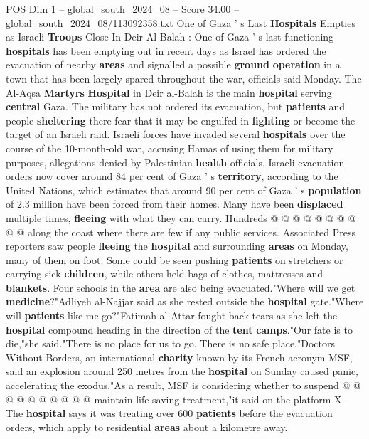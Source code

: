 \begin{textsample}{POS Dim 1 – global\_south\_2024\_08 – Score 34.00 – global\_south\_2024\_08/113092358.txt}  \label{ex:f1_pos_321}
One of Gaza ' s Last \textbf{Hospitals} Empties as Israeli \textbf{Troops} Close In Deir Al Balah : One of Gaza ' s last functioning \textbf{hospitals} has been emptying out in recent days as Israel has ordered the evacuation of nearby \textbf{areas} and signalled a possible \textbf{ground} \textbf{operation} in a town that has been largely spared throughout the war, officials said Monday.
The Al-Aqsa \textbf{Martyrs} \textbf{Hospital} in Deir al-Balah is the main \textbf{hospital} serving \textbf{central} Gaza.
The military has not ordered its evacuation, but \textbf{patients} and people \textbf{sheltering} there fear that it may be engulfed in \textbf{fighting} or become the target of an Israeli raid.
Israeli forces have invaded several \textbf{hospitals} over the course of the 10-month-old war, accusing Hamas of using them for military purposes, allegations denied by Palestinian \textbf{health} officials.
Israeli evacuation orders now cover around 84 per cent of Gaza ' s \textbf{territory}, according to the United Nations, which estimates that around 90 per cent of Gaza ' s \textbf{population} of 2.3 million have been forced from their homes.
Many have been \textbf{displaced} multiple times, \textbf{fleeing} with what they can carry.
Hundreds @ @ @ @ @ @ @ @ @ @ along the coast where there are few if any public services.
Associated Press reporters saw people \textbf{fleeing} the \textbf{hospital} and surrounding \textbf{areas} on Monday, many of them on foot.
Some could be seen pushing \textbf{patients} on stretchers or carrying sick \textbf{children}, while others held bags of clothes, mattresses and \textbf{blankets}.
Four schools in the \textbf{area} are also being evacuated."Where will we get \textbf{medicine}?"Adliyeh al-Najjar said as she rested outside the \textbf{hospital} gate."Where will \textbf{patients} like me go?"Fatimah al-Attar fought back tears as she left the \textbf{hospital} compound heading in the direction of the \textbf{tent} \textbf{camps}."Our fate is to die,"she said."There is no place for us to go.
There is no safe place."Doctors Without Borders, an international \textbf{charity} known by its French acronym MSF, said an explosion around 250 metres from the \textbf{hospital} on Sunday caused panic, accelerating the exodus."As a result, MSF is considering whether to suspend @ @ @ @ @ @ @ @ @ @ maintain life-saving treatment,"it said on the platform X.
The \textbf{hospital} says it was treating over 600 \textbf{patients} before the evacuation orders, which apply to residential \textbf{areas} about a kilometre away.

\end{textsample}
